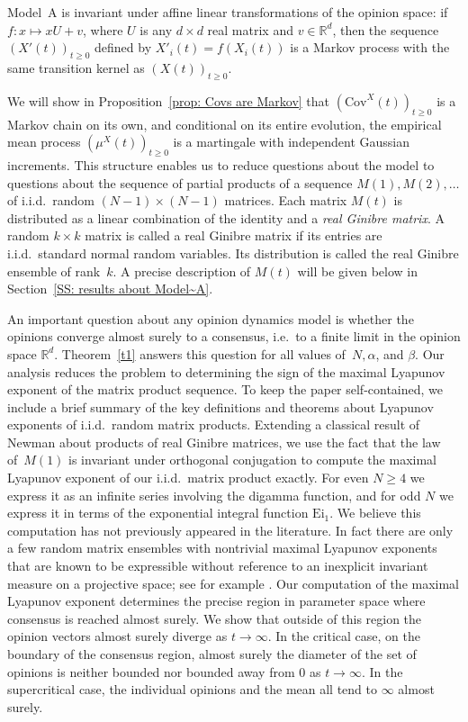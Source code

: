 \documentclass[12pt]{article}
\newcommand{\1}{\mathbf{1}}
\begin{document}
Model~A is invariant under affine linear transformations of the opinion space: if $f: x \mapsto xU + v$, where $U$ is any $d\times d$ real matrix and $v \in \mathbb{R}^{d}$, then the sequence $\left(X'(t)\right)_{t \ge 0}$ defined by $X'_i(t) = f(X_i(t))$ is a Markov process with the same transition kernel as $\left(X(t)\right)_{t \ge 0}$. 

We will show in Proposition~\ref{prop: Covs are Markov} that $\left(\mathrm{Cov}^X(t)\right)_{t \ge 0}$ is a Markov chain on its own, and conditional on its entire evolution, the empirical mean process $\left(\mu^X(t)\right)_{t \ge 0}$ is a martingale with independent Gaussian increments. This structure enables us to reduce questions about the model to questions about the sequence of partial products of a sequence $M(1), M(2), \dots$ of i.i.d.~random $(N-1)\times(N-1)$ matrices. Each matrix $M(t)$ is distributed as a linear combination of the identity and a \emph{real Ginibre matrix}. A random $k\times k$ matrix is called a real Ginibre matrix if its entries are i.i.d.~standard normal random variables. Its distribution is called the real Ginibre ensemble of rank~$k$. A precise description of $M(t)$ will be given below in Section~\ref{SS: results about Model~A}.

An important question about any opinion dynamics model is whether the opinions converge almost surely to a consensus, i.e.~to a finite limit in the opinion space $\mathbb{R}^d$. Theorem~\ref{t1} answers this question for all values of~$N, \alpha$, and $\beta$. Our analysis reduces the problem to determining the sign of the maximal Lyapunov exponent of the matrix product sequence.  To keep the paper self-contained, we include a brief summary of the key definitions and theorems about Lyapunov exponents of i.i.d.~random matrix products.  Extending a classical result of Newman \cite{Newman} about products of real Ginibre matrices, we use the fact that the law of~$M(1)$ is invariant under orthogonal conjugation to compute the maximal Lyapunov exponent of our i.i.d.~matrix product exactly. For even $N \ge 4$ we express it as an infinite series involving the digamma function, and for odd $N$ we express it in terms of the exponential integral function $\mathrm{Ei}_1$. We believe this computation has not previously appeared in the literature. In fact there are only a few random matrix ensembles with nontrivial maximal Lyapunov exponents that are known to be expressible without reference to an inexplicit invariant measure on a projective space; see for example \cite{Forrester, Kargin, Marklof, Newman}.  Our computation of the maximal Lyapunov exponent determines the precise region in parameter space where consensus is reached almost surely. We show that outside of this region the opinion vectors almost surely diverge as $t \to \infty$. In the critical case, on the boundary of the consensus region, almost surely the diameter of the set of opinions is neither bounded nor bounded away from $0$ as $t \to \infty$. In the supercritical case, the individual opinions and the mean all tend to $\infty$ almost surely. 
\end{document}
